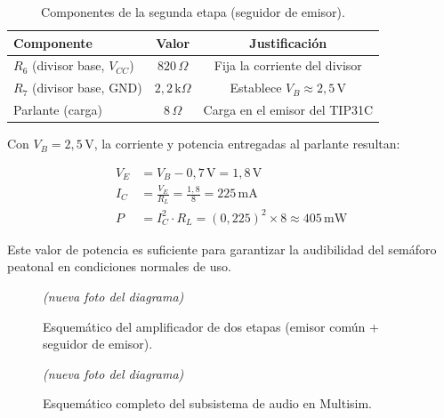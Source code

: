 \documentclass[12pt,onecolumn]{IEEEtran}
\begin{document}
\begin{table}[H]
\centering
\caption{Componentes de la segunda etapa (seguidor de emisor).}
\label{tab:seguidor_emisor}
\begin{tabular}{lcc}
\toprule
\textbf{Componente} & \textbf{Valor} & \textbf{Justificación} \\
\midrule
$R_6$ (divisor base, $V_{CC}$) & $820\,\Omega$           & Fija la corriente del divisor \\
$R_7$ (divisor base, GND)      & $2{,}2\,\text{k}\Omega$ & Establece $V_B \approx 2{,}5\,\text{V}$ \\
Parlante (carga)               & $8\,\Omega$             & Carga en el emisor del TIP31C \\
\bottomrule
\end{tabular}
\end{table}

Con $V_B = 2{,}5\,\text{V}$, la corriente y potencia entregadas al parlante resultan:

\begin{align}
    V_E &= V_B - 0{,}7\,\text{V} = 1{,}8\,\text{V} \\
    I_C &= \frac{V_E}{R_L} = \frac{1{,}8}{8} = 225\,\text{mA} \\
    P   &= I_C^2 \cdot R_L = (0{,}225)^2 \times 8 \approx 405\,\text{mW}
\end{align}

Este valor de potencia es suficiente para garantizar la audibilidad del semáforo peatonal en condiciones normales de uso.

\begin{figure}[H]
    \centering
    \begin{center}\textit{(nueva foto del diagrama)}\end{center}
    \caption{Esquemático del amplificador de dos etapas (emisor común + seguidor de emisor).}
    \label{fig:amplificador}
\end{figure}

\begin{figure}[H]
    \centering
    \begin{center}\textit{(nueva foto del diagrama)}\end{center}
    \caption{Esquemático completo del subsistema de audio en Multisim.}
    \label{fig:subsistema_audio}
\end{figure}

\end{document}
